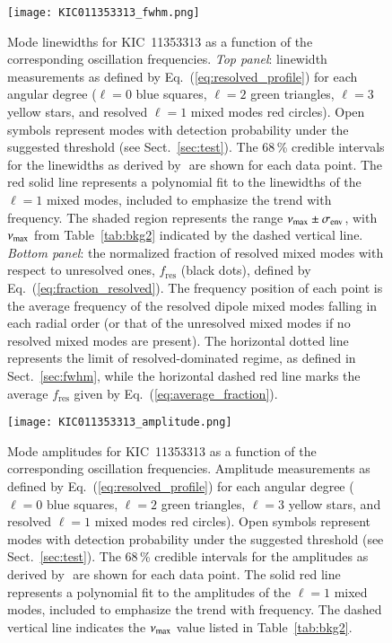 \begin{figure}
   \centering
   \texttt{[image: KIC011353313\_fwhm.png]}
      \caption{Mode linewidths for KIC~11353313 as a function of the corresponding oscillation frequencies. \textit{Top panel}: linewidth measurements as defined by Eq.~(\ref{eq:resolved_profile}) for each angular degree ($\ell = 0$ blue squares, $\ell = 2$ green triangles, $\ell = 3$ yellow stars, and resolved $\ell = 1$ mixed modes red circles). Open symbols represent modes with detection probability under the suggested threshold (see Sect.~\ref{sec:test}). The 68\,\% credible intervals for the linewidths as derived by \diamonds\,\,are shown for each data point. The red solid line represents a polynomial fit to the linewidths of the $\ell = 1$ mixed modes, included to emphasize the trend with frequency. The shaded region represents the range $\nu_\mathrm{max} \pm \sigma_\mathrm{env}$, with $\nu_\mathrm{max}$ from Table~\ref{tab:bkg2} indicated by the dashed vertical line. \textit{Bottom panel}: the normalized fraction of resolved mixed modes with respect to unresolved ones, $f_\mathrm{res}$ (black dots), defined by Eq.~(\ref{eq:fraction_resolved}). The frequency position of each point is the average frequency of the resolved dipole mixed modes falling in each radial order (or that of the unresolved mixed modes if no resolved mixed modes are present). The horizontal dotted line represents the limit of resolved-dominated regime, as defined in Sect.~\ref{sec:fwhm}, while the horizontal dashed red line marks the average $f_\mathrm{res}$ given by Eq.~(\ref{eq:average_fraction}).}
    \label{fig:11353313fwhm}
\end{figure}


\begin{figure}
   \centering
   \texttt{[image: KIC011353313\_amplitude.png]}
      \caption{Mode amplitudes for KIC~11353313 as a function of the corresponding oscillation frequencies. Amplitude measurements as defined by Eq.~(\ref{eq:resolved_profile}) for each angular degree ($\ell = 0$ blue squares, $\ell = 2$ green triangles, $\ell = 3$ yellow stars, and resolved $\ell = 1$ mixed modes red circles). Open symbols represent modes with detection probability under the suggested threshold (see Sect.~\ref{sec:test}). The 68\,\% credible intervals for the amplitudes as derived by \diamonds\,\,are shown for each data point. The solid red line represents a polynomial fit to the amplitudes of the $\ell = 1$ mixed modes, included to emphasize the trend with frequency. The dashed vertical line indicates the $\nu_\mathrm{max}$ value listed in Table~\ref{tab:bkg2}.}
    \label{fig:11353313amplitude}
\end{figure}
\clearpage


